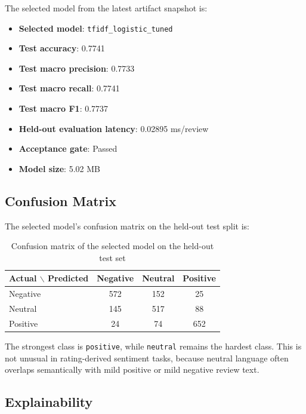 \documentclass[11pt,a4paper]{article}
\newcommand{\smallmetric}[2]{\textbf{#1}: #2}
\begin{document}
The selected model from the latest artifact snapshot is:

\begin{itemize}[leftmargin=1.4em]
  \item \smallmetric{Selected model}{\texttt{tfidf\_logistic\_tuned}}
  \item \smallmetric{Test accuracy}{0.7741}
  \item \smallmetric{Test macro precision}{0.7733}
  \item \smallmetric{Test macro recall}{0.7741}
  \item \smallmetric{Test macro F1}{0.7737}
  \item \smallmetric{Held-out evaluation latency}{0.02895 ms/review}
  \item \smallmetric{Acceptance gate}{Passed}
  \item \smallmetric{Model size}{5.02 MB}
\end{itemize}

\subsection{Confusion Matrix}

The selected model's confusion matrix on the held-out test split is:

\begin{table}[H]
  \centering
  \caption{Confusion matrix of the selected model on the held-out test set}
  \begin{tabular}{lccc}
    \toprule
    \textbf{Actual $\backslash$ Predicted} & \textbf{Negative} & \textbf{Neutral} & \textbf{Positive} \\
    \midrule
    Negative & 572 & 152 & 25 \\
    Neutral & 145 & 517 & 88 \\
    Positive & 24 & 74 & 652 \\
    \bottomrule
  \end{tabular}
\end{table}

The strongest class is \texttt{positive}, while \texttt{neutral} remains the hardest class. This is not unusual in rating-derived sentiment tasks, because neutral language often overlaps semantically with mild positive or mild negative review text.

\subsection{Explainability}
\end{document}
